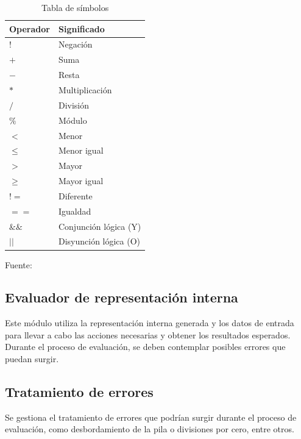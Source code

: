 \begin{table}[!h]
  \begin{center}
    \begin{tabularx}{0.8\textwidth}{|X|X|}
      \hline
      \textbf{Operador} & \textbf{Significado} \\
      \hline
      $!$ & Negación \\
      \hline
      $+$ & Suma \\
      \hline
      $-$ & Resta \\
      \hline
      $*$ & Multiplicación \\
      \hline
      $/$ & División \\
      \hline
      $\%$ & Módulo \\
      \hline
      $<$ & Menor \\
      \hline
      $\leq$ & Menor igual \\
      \hline
      $>$ & Mayor \\
      \hline
      $\geq$ & Mayor igual \\
      \hline
      $!=$ & Diferente \\
      \hline
      $==$ & Igualdad \\
      \hline
      $\&\&$ & Conjunción lógica (Y) \\
      \hline
      $||$ & Disyunción lógica (O) \\
      \hline
    \end{tabularx}
  \end{center}
  \caption{Tabla de símbolos}
  \centering Fuente: \parencite{lu1tr0n2016}
  \label{tab:simbolos}
\end{table}

\subsection{Evaluador de representación interna}
Este módulo utiliza la representación interna generada y los datos de entrada para llevar a cabo las acciones necesarias y obtener los resultados esperados. Durante el proceso de evaluación, se deben contemplar posibles errores que puedan surgir. \parencite{LabraGayo2003}

\subsection{Tratamiento de errores}
Se gestiona el tratamiento de errores que podrían surgir durante el proceso de evaluación, como desbordamiento de la pila o divisiones por cero, entre otros. \parencite{LabraGayo2003}

